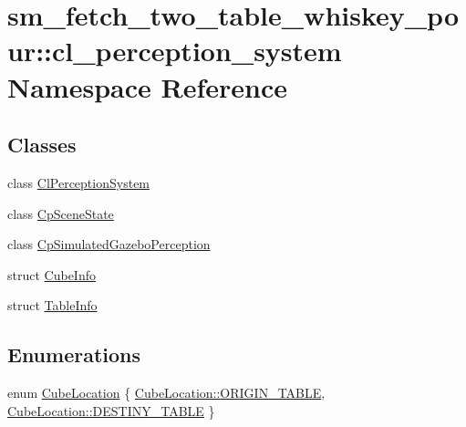 \hypertarget{namespacesm__fetch__two__table__whiskey__pour_1_1cl__perception__system}{}\section{sm\+\_\+fetch\+\_\+two\+\_\+table\+\_\+whiskey\+\_\+pour\+:\+:cl\+\_\+perception\+\_\+system Namespace Reference}
\label{namespacesm__fetch__two__table__whiskey__pour_1_1cl__perception__system}
\subsection*{Classes}
\begin{DoxyCompactItemize}
\item 
class \hyperlink{classsm__fetch__two__table__whiskey__pour_1_1cl__perception__system_1_1ClPerceptionSystem}{Cl\+Perception\+System}
\item 
class \hyperlink{classsm__fetch__two__table__whiskey__pour_1_1cl__perception__system_1_1CpSceneState}{Cp\+Scene\+State}
\item 
class \hyperlink{classsm__fetch__two__table__whiskey__pour_1_1cl__perception__system_1_1CpSimulatedGazeboPerception}{Cp\+Simulated\+Gazebo\+Perception}
\item 
struct \hyperlink{structsm__fetch__two__table__whiskey__pour_1_1cl__perception__system_1_1CubeInfo}{Cube\+Info}
\item 
struct \hyperlink{structsm__fetch__two__table__whiskey__pour_1_1cl__perception__system_1_1TableInfo}{Table\+Info}
\end{DoxyCompactItemize}
\subsection*{Enumerations}
\begin{DoxyCompactItemize}
\item 
enum \hyperlink{namespacesm__fetch__two__table__whiskey__pour_1_1cl__perception__system_a7523acd4abcc84c78d6a15965f9c25b9}{Cube\+Location} \{ \hyperlink{namespacesm__fetch__two__table__whiskey__pour_1_1cl__perception__system_a7523acd4abcc84c78d6a15965f9c25b9ae5ee34c3ef8ec4a46a00a218416c7b1d}{Cube\+Location\+::\+O\+R\+I\+G\+I\+N\+\_\+\+T\+A\+B\+LE}, 
\hyperlink{namespacesm__fetch__two__table__whiskey__pour_1_1cl__perception__system_a7523acd4abcc84c78d6a15965f9c25b9acdc3fdda18904b4a1ac0be036c86f973}{Cube\+Location\+::\+D\+E\+S\+T\+I\+N\+Y\+\_\+\+T\+A\+B\+LE}
 \}
\end{DoxyCompactItemize}



